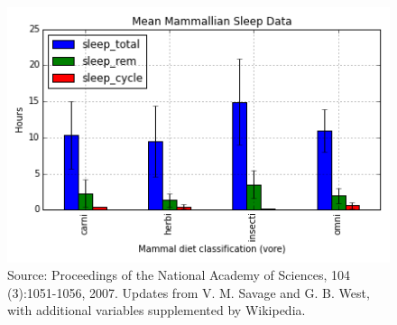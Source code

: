 \begin{figure}[H] 
    \centering
    \includegraphics[width=.75\textwidth]{MeanMammal.png}
    \caption{Source:  Proceedings of the National Academy of Sciences, 104 (3):1051-1056, 2007. Updates from V. M. Savage and G. B. West, with additional variables supplemented by Wikipedia.}
    \label{fig:barplot}
\end{figure}

